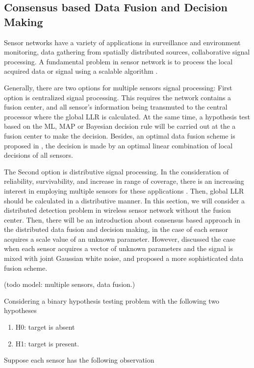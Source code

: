 \subsection{Consensus based Data Fusion and Decision Making}

Sensor networks have a variety of applications in surveillance and
environment monitoring, data gathering from spatially distributed
sources, collaborative signal processing. A fundamental problem in
sensor network is to process the local acquired data or signal using
a scalable algorithm \cite{Olfati-Saber2005a}. 

Generally, there are two options for multiple sensors signal processing:
First option is centralized signal processing. This requires the network
contains a fusion center, and all sensor's information being transmuted
to the central processor where the global LLR is calculated. At the
same time, a hypothesis test based on the ML, MAP or Bayesian decision
rule will be carried out at the a fusion center to make the decision.
Besides, an optimal data fusion scheme is proposed in \cite{Chair1986},
the decision is made by an optimal linear combination of local decisions
of all sensors. 

The Second option is distributive signal processing. In the consideration
of reliability, survivability, and increase in range of coverage,
there is an increasing interest in employing multiple sensors for
these applications \cite{Chair1986}. Then, global LLR should be calculated
in a distributive manner. In this section, we will consider a distributed
detection problem in wireless sensor network without the fusion center.
Then, there will be an introduction about consensus based approach
in the distributed data fusion and decision making, in the case of
each sensor acquires a scale value of an unknown parameter. However,
\cite{Xiao2005} discussed the case when each sensor acquires a vector
of unknown parameters and the signal is mixed with joint Gaussian
white noise, and proposed a more sophisticated data fusion scheme. 

(todo model: multiple sensors, data fusion.)

Considering a binary hypothesis testing problem with the following
two hypotheses
\begin{enumerate}
\item H0: target is absent
\item H1: target is present.
\end{enumerate}
Suppose each sensor has the following observation

